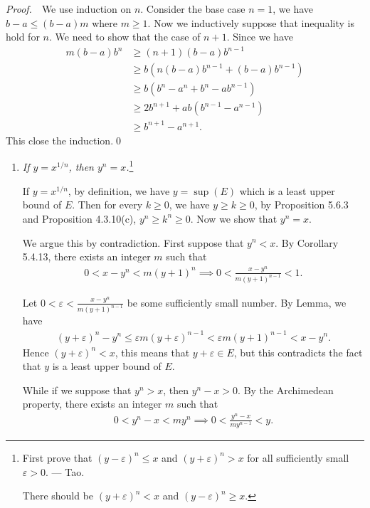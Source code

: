 \documentclass{book}
\newcommand{\pff}{\vspace{.25em}\noindent\emph{Proof.}~~}
\begin{document}
\pff We use induction on $n$. Consider the base case $n=1$, we have $b-a\leq(b-a)m$ where $m\geq 1$. Now we inductively suppose that inequality is hold for $n$. We need to show that the case of $n+1$. Since we have
    \begin{align*}
        m(b-a)b^n&\geq(n+1)(b-a)b^{n-1}\\
        &\geq b\left(n(b-a)b^{n-1}+(b-a)b^{n-1}\right)\\
        &\geq b\left(b^n-a^n+b^n-ab^{n-1}\right)\\
        &\geq 2b^{n+1}+ab(b^{n-1}-a^{n-1})\\
        &\geq b^{n+1}-a^{n+1}.
    \end{align*}
This close the induction.\qed
\begin{enumerate}
    \item \emph{If $y=x^{1/n}$, then $y^n=x$.}\footnote{First prove that $(y-\varepsilon)^n\leq x$ and $(y+\varepsilon)^n>x$ for all sufficiently small $\varepsilon>0$. --- Tao.

    There should be $(y+\varepsilon)^n<x$ and $(y-\varepsilon)^n\geq x$.}

    If $y=x^{1/n}$, by definition, we have $y=\sup(E)$ which is a least upper bound of $E$. Then for every $k\geq 0$, we have $y\geq k\geq 0$, by Proposition 5.6.3 and Proposition 4.3.10(c), $y^n\geq k^n\geq 0$. Now we show that $y^n=x$.

    We argue this by contradiction. First suppose that $y^n<x$. By Corollary 5.4.13, there exists an integer $m$ such that
        \begin{align*}
            0<x-y^n<m(y+1)^n\implies 0<\frac{x-y^n}{m(y+1)^{n-1}}<1.
        \end{align*}
    
    Let $0<\varepsilon<\frac{x-y^n}{m(y+1)^{n-1}}$ be some sufficiently small number. By Lemma,  we have
        \begin{align*}
            (y+\varepsilon)^n-y^n\leq\varepsilon m(y+\varepsilon)^{n-1}<\varepsilon m(y+1)^{n-1}<x-y^n.
        \end{align*}
    Hence $(y+\varepsilon)^n<x$, this means that $y+\varepsilon\in E$, but this contradicts the fact that $y$ is a least upper bound of $E$.

    While if we suppose that $y^n>x$, then $y^n-x>0$. By the Archimedean property, there exists an integer $m$ such that
    \begin{align*}
        0<y^n-x<my^n\implies 0<\frac{y^n-x}{my^{n-1}}<y.
    \end{align*}


\end{enumerate}
\end{document}
